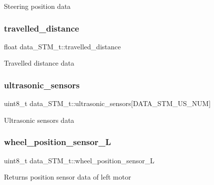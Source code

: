 Steering position data \hypertarget{structdata___s_t_m__t_ae80e8b57c0137231caeb56a150d46aa4}{}\label{structdata___s_t_m__t_ae80e8b57c0137231caeb56a150d46aa4} 
\subsubsection{\texorpdfstring{travelled\+\_\+distance}{travelled\_distance}}
{\footnotesize\ttfamily float data\+\_\+\+S\+T\+M\+\_\+t\+::travelled\+\_\+distance}

Travelled distance data \hypertarget{structdata___s_t_m__t_a2b584d14638921f686e91193ab59937c}{}\label{structdata___s_t_m__t_a2b584d14638921f686e91193ab59937c} 
\subsubsection{\texorpdfstring{ultrasonic\+\_\+sensors}{ultrasonic\_sensors}}
{\footnotesize\ttfamily uint8\+\_\+t data\+\_\+\+S\+T\+M\+\_\+t\+::ultrasonic\+\_\+sensors\mbox{[}D\+A\+T\+A\+\_\+\+S\+T\+M\+\_\+\+U\+S\+\_\+\+N\+UM\mbox{]}}

Ultrasonic sensors data \hypertarget{structdata___s_t_m__t_a179ffd7182c86ef85d3a5bbd1acf3290}{}\label{structdata___s_t_m__t_a179ffd7182c86ef85d3a5bbd1acf3290} 
\subsubsection{\texorpdfstring{wheel\+\_\+position\+\_\+sensor\+\_\+L}{wheel\_position\_sensor\_L}}
{\footnotesize\ttfamily uint8\+\_\+t data\+\_\+\+S\+T\+M\+\_\+t\+::wheel\+\_\+position\+\_\+sensor\+\_\+L}

Returns position sensor data of left motor \hypertarget{structdata___s_t_m__t_a86c2662ee8ae8cef331de1a36285e9ee}{}\label{structdata___s_t_m__t_a86c2662ee8ae8cef331de1a36285e9ee} 
